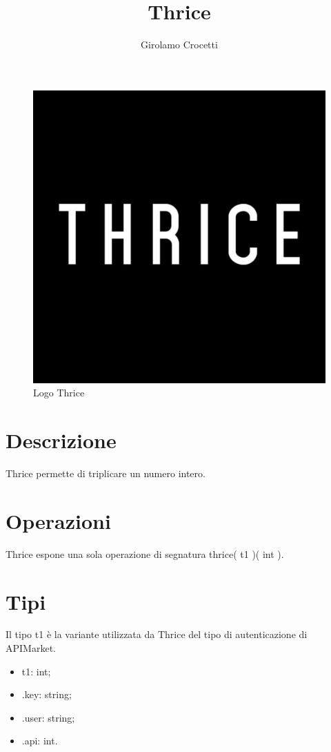 \documentclass[a4paper]{article}
\title{Thrice}
\author{Girolamo Crocetti}
\begin{document}
\maketitle

\begin{figure}[H]
	\centering
	\includegraphics[width=0.3\linewidth]{Thrice.jpg}
	\caption{Logo Thrice}
\end{figure}

\section{Descrizione}

Thrice permette di triplicare un numero intero.

\section{Operazioni}

Thrice espone una sola operazione di segnatura thrice( t1 )( int ).

\section{Tipi}

Il tipo t1 è la variante utilizzata da Thrice del tipo di autenticazione di APIMarket.
\begin{itemize}
	\item t1: int;
	\item .key: string;
	\item .user: string;
	\item .api: int.
\end{itemize}
\end{document}

